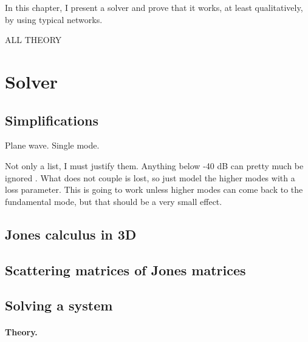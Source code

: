 In this chapter, I present a solver and prove that it works, at least qualitatively, by using typical networks.

ALL THEORY

\section{Solver}

\subsection{Simplifications}

Plane wave.
Single mode.

Not only a list, I must justify them.
Anything below -40 dB can pretty much be ignored .
What does not couple is lost, so just model the higher modes with a loss parameter.
This is going to work unless higher modes can come back to the fundamental mode, but that should be a very small effect.



\subsection{Jones calculus in 3D}

\subsection{Scattering matrices of Jones matrices}

\subsection{Solving a system}

\paragraph{Theory.}

